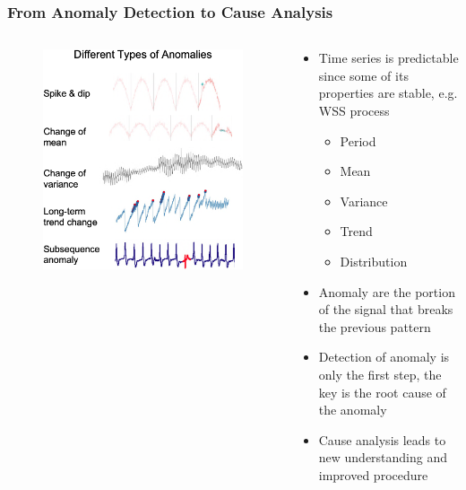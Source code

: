 \documentclass[aspectratio=169,xcolor=x11names,table]{beamer}
\begin{document}
\begin{frame}
	\frametitle{From Anomaly Detection to Cause Analysis}
	\begin{columns}
		\begin{column}{0.4\linewidth}
			\begin{figure}
				\centering
				\includegraphics[width=\columnwidth]{anomaly}
			\end{figure}
		\end{column}
		\hfill
		\begin{column}{0.55\linewidth}
			\begin{itemize}
				\item<1> Time series is predictable since some of its properties are stable, e.g. WSS process
					\begin{itemize}
						\item Period
						\item Mean
						\item Variance
						\item Trend
						\item Distribution
					\end{itemize}
				\item<1> Anomaly are the portion of the signal that breaks the previous pattern
				\item<2> Detection of anomaly is only the first step, the key is the root cause of the anomaly
				\item<2> Cause analysis leads to new understanding and improved procedure
			\end{itemize}
		\end{column}
	\end{columns}
\end{frame}
\end{document}
